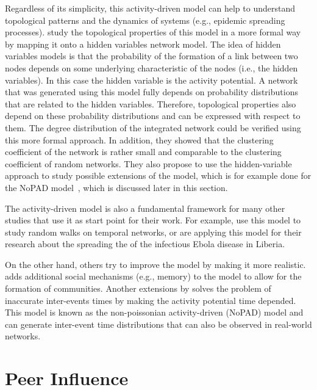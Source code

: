 Regardless of its simplicity, this activity-driven model can help to understand topological patterns and the dynamics of systems (e.g., epidemic spreading processes).
\citet{Starnini2013} study the topological properties of this model in a more formal way by mapping it onto a hidden variables network model.
The idea of hidden variables models is that the probability of the formation of a link between two nodes depends on some underlying characteristic of the nodes (i.e., the hidden variables).
In this case the hidden variable is the activity potential.
A network that was generated using this model fully depends on probability distributions that are related to the hidden variables.
Therefore, topological properties also depend on these probability distributions and can be expressed with respect to them.
The degree distribution of the integrated network could be verified using this more formal approach.
In addition, they showed that the clustering coefficient of the network is rather small and comparable to the clustering coefficient of random networks.
They also propose to use the hidden-variable approach to study possible extensions of the model, which is for example done for the NoPAD model~\cite{Moinet2015}, which is discussed later in this section.

The activity-driven model is also a fundamental framework for many other studies that use it as start point for their work.
For example, \citet{Perra2012b} use this model to study random walks on temporal networks, or \citet{Rizzo2016} are applying this model for their research about the spreading the of the infectious Ebola disease in Liberia.

On the other hand, others try to improve the model by making it more realistic.
\citet{Laurent2015} adds additional social mechanisms (e.g., memory) to the model to allow for the formation of communities.
Another extensions by \citet{Moinet2015, Moinet2016} solves the problem of inaccurate inter-events times by making the activity potential time depended.
This model is known as the non-poissonian activity-driven (NoPAD) model and can generate inter-event time distributions that can also be observed in real-world networks.




\section{Peer Influence}
\label{sec:peer-influence}
